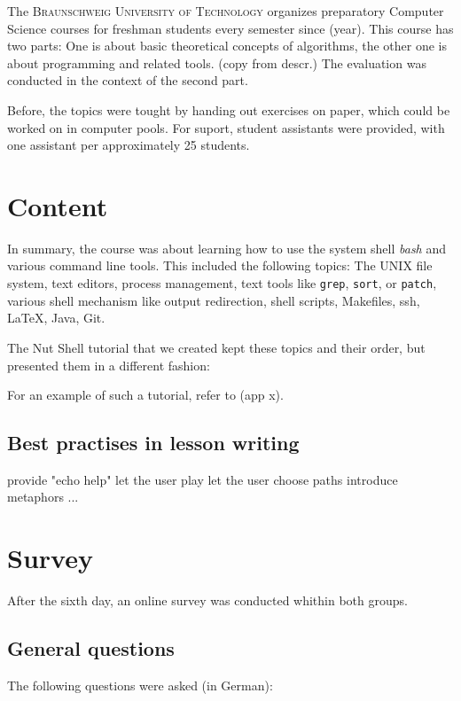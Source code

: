 \documentclass[twoside]{scrreprt}
\begin{document}
The \textsc{Braunschweig University of Technology} organizes preparatory Computer Science courses for freshman students every semester since (year). This course has two parts: One is about basic theoretical concepts of algorithms, the other one is about programming and related tools. (copy from descr.) The evaluation was conducted in the context of the second part.

Before, the topics were tought by handing out exercises on paper, which could be worked on in computer pools. For suport, student assistants were provided, with one assistant per approximately 25 students.



\section{Content}

In summary, the course was about learning how to use the system shell \emph{bash} and various command line tools. This included the following topics: The UNIX file system, text editors, process management, text tools like \texttt{grep}, \texttt{sort}, or \texttt{patch}, various shell mechanism like output redirection, shell scripts, Makefiles, ssh, \LaTeX, Java, Git.

The Nut Shell tutorial that we created kept these topics and their order, but presented them in a different fashion: 

For an example of such a tutorial, refer to (app x).

\subsection{Best practises in lesson writing}

provide "echo help"
let the user play
let the user choose paths
introduce metaphors
...

\section{Survey}

After the sixth day, an online survey was conducted whithin both groups.

\subsection{General questions}

The following questions were asked (in German):
\end{document}
